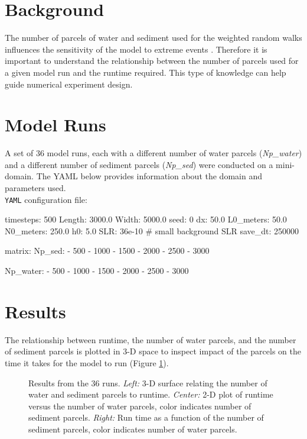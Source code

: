 \section{Background}
The number of parcels of water and sediment used for the weighted random walks influences the sensitivity of the model to extreme events \cite{Liang2015, Liang2015a}.
Therefore it is important to understand the relationship between the number of parcels used for a given model run and the runtime required.
This type of knowledge can help guide numerical experiment design. 

\section{Model Runs}
A set of 36 model runs, each with a different number of water parcels (\textit{Np\_{}water}) and a different number of sediment parcels (\textit{Np\_{}sed}) were conducted on a mini-domain.
The YAML below provides information about the domain and parameters used.\\

\noindent \texttt{YAML} configuration file: \vspace{-6pt}
\begin{boxedverbatim}
timesteps: 500
Length: 3000.0
Width: 5000.0
seed: 0
dx: 50.0
L0_meters: 50.0
N0_meters: 250.0
h0: 5.0
SLR: 36e-10  # small background SLR
save_dt: 250000

matrix:
  Np_sed:
    - 500
    - 1000
    - 1500
    - 2000
    - 2500
    - 3000
    
  Np_water:
    - 500
    - 1000
    - 1500
    - 2000
    - 2500
    - 3000
\end{boxedverbatim}

\section{Results}
The relationship between runtime, the number of water parcels, and the number of sediment parcels is plotted in 3-D space to inspect impact of the parcels on the time it takes for the model to run (Figure \ref{fig:np_v_runtime}).

\begin{figure}
	\caption{Results from the 36 runs. \textit{Left:} 3-D surface relating the number of water and sediment parcels to runtime. \textit{Center:} 2-D plot of runtime versus the number of water parcels, color indicates number of sediment parcels. \textit{Right:} Run time as a function of the number of sediment parcels, color indicates number of water parcels.}
	\label{fig:np_v_runtime}
\end{figure}

